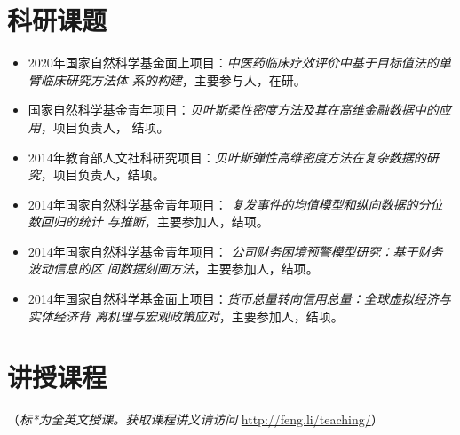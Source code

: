 \documentclass[twoside,a4paper,10pt]{amsart}
\begin{document}
\section*{科研课题}

\begin{itemize}

\item 2020年国家自然科学基金面上项目：\emph{中医药临床疗效评价中基于目标值法的单臂临床研究方法体
    系的构建}，主要参与人，在研。

\item 国家自然科学基金青年项目：\emph{贝叶斯柔性密度方法及其在高维金融数据中的应用}，项目负责人，
  结项。

\item 2014年教育部人文社科研究项目：\emph{贝叶斯弹性高维密度方法在复杂数据的研
    究}，项目负责人，结项。

\item 2014年国家自然科学基金青年项目： \emph{复发事件的均值模型和纵向数据的分位数回归的统计
    与推断}，主要参加人，结项。

\item 2014年国家自然科学基金青年项目： \emph{公司财务困境预警模型研究：基于财务波动信息的区
    间数据刻画方法}，主要参加人，结项。

\item 2014年国家自然科学基金面上项目：\emph{货币总量转向信用总量：全球虚拟经济与实体经济背
    离机理与宏观政策应对}，主要参加人，结项。

\end{itemize}

\section*{讲授课程}
（\emph{标*为全英文授课。获取课程讲义请访问} \url{http://feng.li/teaching/}）
\end{document}
